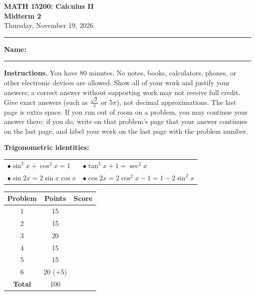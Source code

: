\documentclass[12pt,letterpaper]{article}
\newif\ifsolutions
\begin{document}
\thispagestyle{empty}

\begin{center}
  {\large\bfseries MATH 15200: Calculus II}\\
  {\large\bfseries Midterm 2}\\[0.3em]
  Thursday, November 19, 2026
\end{center}

\vspace{0.25em}
\hrule
\vspace{1.5em}

\textbf{Name:} \rule{4in}{0.4pt}

\ifsolutions
  \begin{center}
    {\color{blue!55!black}\large\bfseries ANSWER KEY}
  \end{center}
\fi

\vspace{0.8em}

\textbf{Instructions.} You have 80 minutes. No notes, books, calculators,
phones, or other electronic devices are allowed. Show all of your work and
justify your answers; a correct answer without supporting work may not receive
full credit. Give exact answers (such as $\tfrac{\sqrt{2}}{3}$ or $5\pi$), not
decimal approximations. The last page is extra space. If you run out of room
on a problem, you may continue your answer there; if you do, write on that
problem's page that your answer continues on the last page, and label your
work on the last page with the problem number.

\vspace{0.8em}

\begin{center}\setlength{\tabcolsep}{40pt}
\textbf{Trigonometric identities:} \\[10pt]
\renewcommand{\arraystretch}{1.5}
\begin{tabular}{ll}
  $\bullet \sin^2x+\cos^2x=1$ & $\bullet \tan^2x+1=\sec^2x$\\
  $\bullet \sin2x=2\sin x\cos x$ & $\bullet \cos2x=2\cos^2x-1=1-2\sin^2x$
\end{tabular}
\end{center}

\vfill

\begin{center}
  \renewcommand{\arraystretch}{1.5}
  \begin{tabular}{|c|c|p{1in}|}
    \hline
    \textbf{Problem} & \textbf{Points} & \textbf{Score} \\
    \hline
    1 & 15 & \\ \hline
    2 & 15 & \\ \hline
    3 & 20 & \\ \hline
    4 & 15 & \\ \hline
    5 & 15 & \\ \hline
    6 & 20 (+5) & \\ \hline
    \textbf{Total} & 100 & \\ \hline
  \end{tabular}
\end{center}
\end{document}
